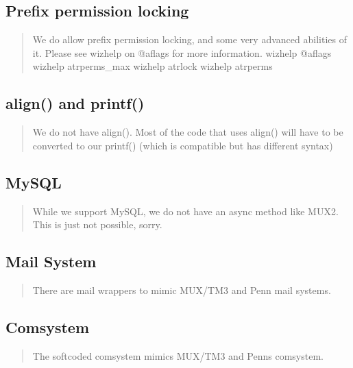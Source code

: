 \documentclass[letterpaper,10pt,english]{sphinxmanual}
\begin{document}
\subsection{Prefix permission locking}
\label{\detokenize{differences:prefix-permission-locking}}\begin{quote}

\sphinxAtStartPar
We do allow prefix permission locking, and some very advanced abilities
of it.  Please see wizhelp on @aflags for more information.
\sphinxhyphen{} wizhelp @aflags
\sphinxhyphen{} wizhelp atrperms\_max
\sphinxhyphen{} wizhelp atrlock
\sphinxhyphen{} wizhelp atrperms
\end{quote}


\subsection{align() and printf()}
\label{\detokenize{differences:align-and-printf}}\begin{quote}

\sphinxAtStartPar
We do not have align().  Most of the code that uses align() will have to
be converted to our printf() (which is compatible but has different syntax)
\end{quote}


\subsection{MySQL}
\label{\detokenize{differences:mysql}}\begin{quote}

\sphinxAtStartPar
While we support MySQL, we do not have an async method like MUX2.  This
is just not possible, sorry.
\end{quote}


\subsection{Mail System}
\label{\detokenize{differences:mail-system}}\begin{quote}

\sphinxAtStartPar
There are mail wrappers to mimic MUX/TM3 and Penn mail systems.
\end{quote}


\subsection{Comsystem}
\label{\detokenize{differences:comsystem}}\begin{quote}

\sphinxAtStartPar
The softcoded comsystem mimics MUX/TM3 and Penn\textquotesingle{}s comsystem.
\end{quote}
\end{document}
